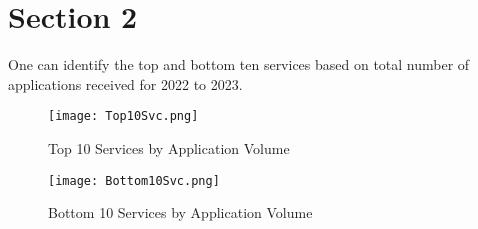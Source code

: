 \section{Section 2}

One can identify the top and bottom ten services based on total number of applications
received for 2022 to 2023.

\begin{figure}
    \centering
    \texttt{[image: Top10Svc.png]}
    \caption{\label{fig:Top10}Top 10 Services by Application Volume}
    \end{figure}

\begin{figure}
    \centering
    \texttt{[image: Bottom10Svc.png]}
    \caption{\label{fig:Bottom10}Bottom 10 Services by Application Volume}
    \end{figure}